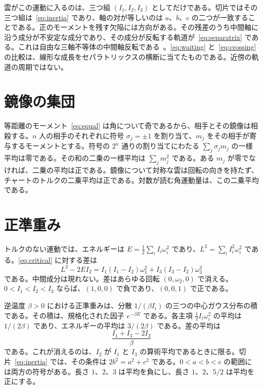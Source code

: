 \documentclass[a4paper]{article}
\begin{document}
雲がこの運動に入るのは、三つ組 \((I_1,I_2,I_3)\) としてだけである。切片ではその三つ組は~\eqref{eq:inertia} であり、軸の対が等しいのは \(a\)、\(b\)、\(c\) の二つが一致することである。正のモーメントを残す欠陥には方向がある。その残差のうち中間軸に沿う成分が不安定な成分であり、その成分が反転する軌道が~\eqref{eq:separatrix} である。これは自由な三軸不等体の中間軸反転である~\cite{ashbaugh1991}。\eqref{eq:waiting} と~\eqref{eq:crossing} の比較は、線形な成長をセパラトリックスの横断に当てたものである。近傍の軌道の周期ではない。

\section{鏡像の集団}
\label{sec:mirror}

等距離のモーメント~\eqref{eq:equal} は角について奇であるから、相手とその鏡像は相殺する。\(n\) 人の相手のそれぞれに符号 \(\sigma_j=\pm 1\) を割り当て、\(m_j\) をその相手が寄与するモーメントとする。符号の \(2^n\) 通りの割り当てにわたる \(\sum_j\sigma_j m_j\) の一様平均は零である。その和の二乗の一様平均は \(\sum_j m_j^2\) である。ある \(m_j\) が零でなければ、二乗の平均は正である。鏡像について対称な雲は回転の向きを持たず、チャートのトルクの二乗平均は正である。対数が読む角運動量は、この二乗平均である。

\section{正準重み}
\label{sec:canonical}

トルクのない運動では、エネルギーは \(E=\tfrac12\sum_i I_i\omega_i^2\) であり、\(L^2=\sum_i I_i^2\omega_i^2\) である。\eqref{eq:critical} に対する差は
\begin{equation}
\label{eq:gap}
L^2-2EI_2=I_1(I_1-I_2)\omega_1^2+I_3(I_3-I_2)\omega_3^2
\end{equation}
である。中間成分は現れない。差はあらゆる回転 \((0,\omega_2,0)\) で消える。\(0<I_1<I_2<I_3\) ならば、\((1,0,0)\) で負であり、\((0,0,1)\) で正である。

逆温度 \(\beta>0\) における正準重みは、分散 \(1/(\beta I_i)\) の三つの中心ガウス分布の積である。その積は、規格化された因子 \(e^{-\beta E}\) である。各主項 \(\tfrac12 I_i\omega_i^2\) の平均は \(1/(2\beta)\) であり、エネルギーの平均は \(3/(2\beta)\) である。差の平均は
\begin{equation}
\label{eq:mean-gap}
\frac{I_1+I_3-2I_2}{\beta}
\end{equation}
である。これが消えるのは、\(I_2\) が \(I_1\) と \(I_3\) の算術平均であるときに限る。切片~\eqref{eq:inertia} では、その条件は \(2b^2=a^2+c^2\) である。\(0<a<b<c\) の範囲には両方の符号がある。長さ \(1\)、\(2\)、\(3\) は平均を負にし、長さ \(1\)、\(2\)、\(5/2\) は平均を正にする。
\end{document}

